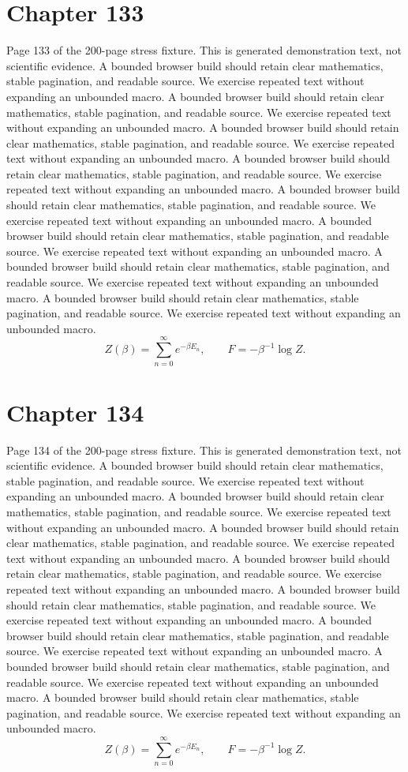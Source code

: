 \documentclass[11pt]{article}
\begin{document}
\section*{Chapter 133}
Page 133 of the 200-page stress fixture. This is generated demonstration text, not scientific evidence.
A bounded browser build should retain clear mathematics, stable pagination, and readable source. We exercise repeated text without expanding an unbounded macro.
A bounded browser build should retain clear mathematics, stable pagination, and readable source. We exercise repeated text without expanding an unbounded macro.
A bounded browser build should retain clear mathematics, stable pagination, and readable source. We exercise repeated text without expanding an unbounded macro.
A bounded browser build should retain clear mathematics, stable pagination, and readable source. We exercise repeated text without expanding an unbounded macro.
A bounded browser build should retain clear mathematics, stable pagination, and readable source. We exercise repeated text without expanding an unbounded macro.
A bounded browser build should retain clear mathematics, stable pagination, and readable source. We exercise repeated text without expanding an unbounded macro.
A bounded browser build should retain clear mathematics, stable pagination, and readable source. We exercise repeated text without expanding an unbounded macro.
A bounded browser build should retain clear mathematics, stable pagination, and readable source. We exercise repeated text without expanding an unbounded macro.
\[Z(\beta)=\sum_{n=0}^{\infty}e^{-\beta E_n},\qquad F=-\beta^{-1}\log Z.\]
\newpage
\section*{Chapter 134}
Page 134 of the 200-page stress fixture. This is generated demonstration text, not scientific evidence.
A bounded browser build should retain clear mathematics, stable pagination, and readable source. We exercise repeated text without expanding an unbounded macro.
A bounded browser build should retain clear mathematics, stable pagination, and readable source. We exercise repeated text without expanding an unbounded macro.
A bounded browser build should retain clear mathematics, stable pagination, and readable source. We exercise repeated text without expanding an unbounded macro.
A bounded browser build should retain clear mathematics, stable pagination, and readable source. We exercise repeated text without expanding an unbounded macro.
A bounded browser build should retain clear mathematics, stable pagination, and readable source. We exercise repeated text without expanding an unbounded macro.
A bounded browser build should retain clear mathematics, stable pagination, and readable source. We exercise repeated text without expanding an unbounded macro.
A bounded browser build should retain clear mathematics, stable pagination, and readable source. We exercise repeated text without expanding an unbounded macro.
A bounded browser build should retain clear mathematics, stable pagination, and readable source. We exercise repeated text without expanding an unbounded macro.
\[Z(\beta)=\sum_{n=0}^{\infty}e^{-\beta E_n},\qquad F=-\beta^{-1}\log Z.\]
\newpage
\end{document}
